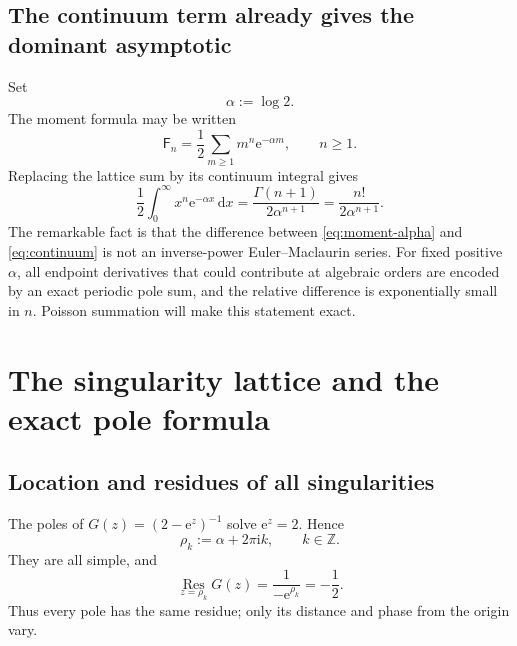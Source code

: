 \documentclass[11pt,a4paper]{article}
\theoremstyle{definition}
\theoremstyle{remark}
\newcommand{\Fub}{\mathsf F}
\newcommand{\e}{\mathrm e}
\newcommand{\ii}{\mathrm i}
\newcommand{\dd}{\,\mathrm d}
\newcommand{\Res}{\operatorname*{Res}}
\newcommand{\Z}{\mathbb Z}
\begin{document}
\subsection{The continuum term already gives the dominant asymptotic}

Set
\begin{equation}\label{eq:alpha}
 \alpha:=\log 2.
\end{equation}
The moment formula may be written
\begin{equation}\label{eq:moment-alpha}
 \Fub_n=\frac12\sum_{m\ge1}m^n\e^{-\alpha m},
 \qquad n\ge1.
\end{equation}
Replacing the lattice sum by its continuum integral gives
\begin{equation}\label{eq:continuum}
 \frac12\int_0^\infty x^n\e^{-\alpha x}\dd x
 =\frac{\Gamma(n+1)}{2\alpha^{n+1}}
 =\frac{n!}{2\alpha^{n+1}}.
\end{equation}
The remarkable fact is that the difference between \eqref{eq:moment-alpha}
and \eqref{eq:continuum} is not an inverse-power Euler--Maclaurin series.  For
fixed positive \(\alpha\), all endpoint derivatives that could contribute at
algebraic orders are encoded by an exact periodic pole sum, and the relative
difference is exponentially small in \(n\).  Poisson summation will make this
statement exact.

\section{The singularity lattice and the exact pole formula}

\subsection{Location and residues of all singularities}

The poles of \(G(z)=(2-\e^z)^{-1}\) solve \(\e^z=2\).  Hence
\begin{equation}\label{eq:rho}
 \rho_k:=\alpha+2\pi\ii k,
 \qquad k\in\Z.
\end{equation}
They are all simple, and
\begin{equation}\label{eq:residue}
 \Res_{z=\rho_k}G(z)
 =\frac1{-\e^{\rho_k}}=-\frac12.
\end{equation}
Thus every pole has the same residue; only its distance and phase from the
origin vary.
\end{document}

